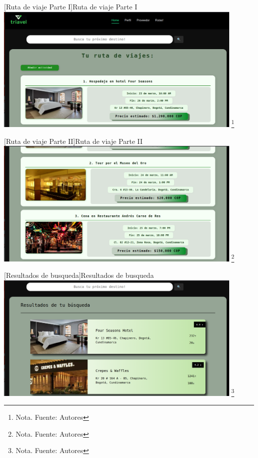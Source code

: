      \vspace{2mm}
    \begin{minipage}{0.9\textwidth}
    \centering
    [{Ruta de viaje Parte I}]{Ruta de viaje Parte I}
    \label{prot8}
    \includegraphics[width=0.9\textwidth]{Content/Images/RutaDeViaje1.png}
    \footnote{Nota. \textup{Fuente: Autores}}
    \end{minipage}

      \vspace{2mm}
    \begin{minipage}{0.9\textwidth}
    \centering
    [{Ruta de viaje Parte II}]{Ruta de viaje Parte II}
    \label{prot9}
    \includegraphics[width=0.9\textwidth]{Content/Images/RutaDeViaje2.png}
    \footnote{Nota. \textup{Fuente: Autores}}
    \end{minipage}

      \vspace{2mm}
    \begin{minipage}{0.9\textwidth}
    \centering
    [{Resultados de busqueda}]{Resultados de busqueda}
    \label{prot10}
    \includegraphics[width=0.9\textwidth]{Content/Images/ResultadosDeBusqueda.png}
    \footnote{Nota. \textup{Fuente: Autores}}
    \end{minipage}

